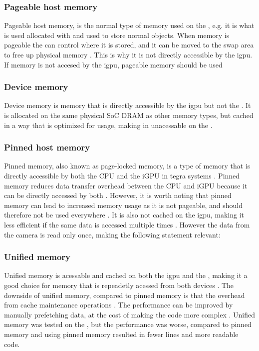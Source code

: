 \subsubsection{Pageable host memory}
Pageable host memory, is the normal type of memory used on the \jx,
e.g. it is what is used allocated with  and used to store normal \py objects.
When memory is pageable the \cpu can control where it is stored, and it can be moved to the \gls{swap} area to free up physical memory \cite[6]{nvidiaCUDAFTegra2023}.
This is why it is not directly accessible by the \gls{igpu}.
If memory is not accesed by the \gls{igpu}, pageable memory should be used \cite[9]{nvidiaCUDAFTegra2023}


\subsubsection{Device memory}
Device memory is memory that is directly accessible by the \gls{igpu} but not the \cpu \cite[5]{nvidiaCUDAFTegra2023}.
It is allocated on the same physical SoC DRAM as other memory types, but cached in a way that is optimized for \gpu usage, making in unacessable on the \cpu \cite[5]{nvidiaCUDAFTegra2023}.


\subsubsection{Pinned host memory}
Pinned memory, also known as page-locked memory, is a type of memory that is directly accessible by both the CPU and the iGPU in \gls{tegra} systems \cite{nvidiaCUDAFTegra2023}.
Pinned memory reduces data transfer overhead between the CPU and iGPU because it can be directly accessed by both \cite{nvidiaCUDAFTegra2023}.
However, it is worth noting that pinned memory can lead to increased memory usage as it is not pageable, and should therefore not be used everywhere \cite[38]{nvidiaCUDABestPractices2023}.
It is also not cached on the \gls{igpu}, making it less efficient if the same data is accessed multiple times \cite{nvidiaCUDAFTegra2023}.
However the data from the camera is read only once, making the following statement relevant:
\cite[10]{nvidiaCUDAFTegra2023}


\subsubsection{Unified memory}
Unified memory is acessable and cached on both the \gls{igpu} and the \cpu, making it a good choice for memory that is repeadetly acessed from both devices \cite[10]{nvidiaCUDAFTegra2023}.
The downside of unified memory, compared to pinned memory is that the overhead from cache maintenance operations \cite[12]{nvidiaCUDAFTegra2023}.
The performance can be improved by manually prefetching data, at the cost of making the code more complex \cite[13]{nvidiaCUDAFTegra2023}.
Unified memory was tested on the \sr, but the performance was worse, compared to pinned memory and using pinned memory resulted in fewer lines and more readable code.
